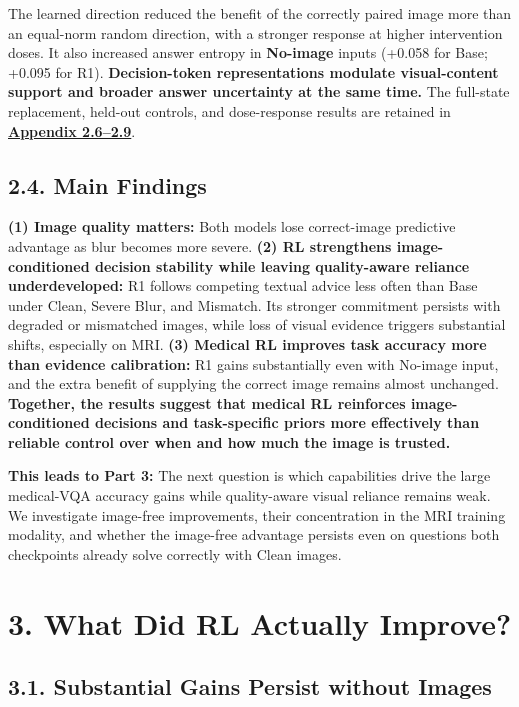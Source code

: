 \documentclass[
  10pt,
  a4paper,
]{article}
\begin{document}
The learned direction reduced the benefit of the correctly paired image
more than an equal-norm random direction, with a stronger response at
higher intervention doses. It also increased answer entropy in
\textbf{No-image} inputs (+0.058 for Base; +0.095 for R1).
\textbf{Decision-token representations modulate visual-content support
and broader answer uncertainty at the same time.} The full-state
replacement, held-out controls, and dose-response results are retained
in
\textbf{\hyperref[representation-evidence-quality-versus-content]{Appendix
2.6--2.9}}.

\subsection{2.4. Main Findings}\label{main-findings}

\textbf{(1) Image quality matters:} Both models lose correct-image
predictive advantage as blur becomes more severe. \textbf{(2) RL
strengthens image-conditioned decision stability while leaving
quality-aware reliance underdeveloped:} R1 follows competing textual
advice less often than Base under Clean, Severe Blur, and Mismatch. Its
stronger commitment persists with degraded or mismatched images, while
loss of visual evidence triggers substantial shifts, especially on MRI.
\textbf{(3) Medical RL improves task accuracy more than evidence
calibration:} R1 gains substantially even with No-image input, and the
extra benefit of supplying the correct image remains almost unchanged.
\textbf{Together, the results suggest that medical RL reinforces
image-conditioned decisions and task-specific priors more effectively
than reliable control over when and how much the image is trusted.}

\textbf{This leads to Part 3:} The next question is which capabilities
drive the large medical-VQA accuracy gains while quality-aware visual
reliance remains weak. We investigate image-free improvements, their
concentration in the MRI training modality, and whether the image-free
advantage persists even on questions both checkpoints already solve
correctly with Clean images.

\section{3. What Did RL Actually
Improve?}\label{what-did-rl-actually-improve}

\subsection{3.1. Substantial Gains Persist without
Images}\label{substantial-gains-persist-without-images}
\end{document}
